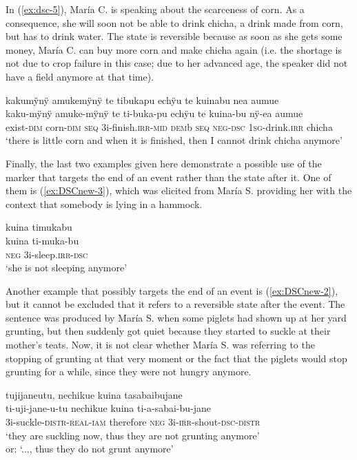 In (\ref{ex:dsc-5}), María C. is speaking about the scarceness of corn. As a consequence, she will soon not be able to drink chicha, a drink made from corn, but has to drink water. The state is reversible because as soon as she gets some money, María C. can buy more corn and make chicha again (i.e. the shortage is not due to crop failure in this case; due to her advanced age, the speaker did not have a field anymore at that time).

\ea\label{ex:dsc-5}
\begingl
\glpreamble kakumÿnÿ amukemÿnÿ te tibukapu echÿu te kuinabu nea aumue\\
\gla kaku-mÿnÿ amuke-mÿnÿ te ti-buka-pu echÿu te kuina-bu nÿ-ea aumue\\
\glb exist-\textsc{dim} corn-\textsc{dim} \textsc{seq} 3i-finish.\textsc{irr}-\textsc{mid} \textsc{dem}b \textsc{seq} \textsc{neg}-\textsc{dsc} 1\textsc{sg}-drink.\textsc{irr} chicha\\
\glft ‘there is little corn and when it is finished, then I cannot drink chicha anymore’
\endgl
\trailingcitation{[ump-p110815sf.693]}
\xe

Finally, the last two examples given here demonstrate a possible use of the marker that targets the end of an event rather than the state after it. One of them is (\ref{ex:DSCnew-3}), which was elicited from María S. providing her with the context that somebody is lying in a hammock.

\ea\label{ex:DSCnew-3}
\begingl
\glpreamble kuina timukabu\\
\gla kuina ti-muka-bu\\
\glb \textsc{neg} 3i-sleep.\textsc{irr}-\textsc{dsc}\\
\glft ‘she is not sleeping anymore’
\endgl
\trailingcitation{[rxx-e181024l]}
\xe

Another example that possibly targets the end of an event is (\ref{ex:DSCnew-2}), but it cannot be excluded that it refers to a reversible state after the event. The sentence was produced by María S. when some piglets had shown up at her yard grunting, but then suddenly got quiet because they started to suckle at their mother’s teats. Now, it is not clear whether María S. was referring to the stopping of grunting at that very moment or the fact that the piglets would stop grunting for a while, since they were not hungry anymore.

\ea\label{ex:DSCnew-2}
\begingl
\glpreamble tujijaneutu, nechikue kuina tasabaibujane\\
\gla ti-uji-jane-u-tu nechikue kuina ti-a-sabai-bu-jane\\
\glb 3i-suckle-\textsc{distr}-\textsc{real}-\textsc{iam} therefore \textsc{neg} 3i-\textsc{irr}-shout-\textsc{dsc}-\textsc{distr}\\
\glft ‘they are suckling now, thus they are not grunting anymore’\\or: ‘..., thus they do not grunt anymore’
\endgl
\trailingcitation{[rmx-e150922l.155-156]}
\xe
{}


